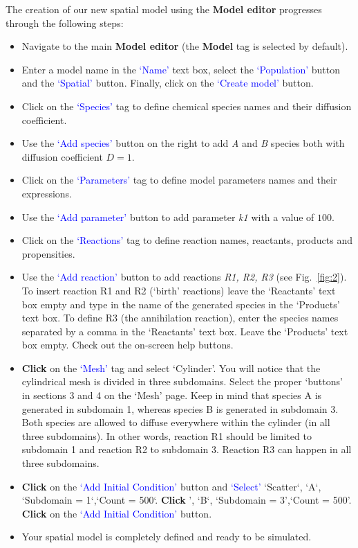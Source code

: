 The creation of our new spatial model using the \textbf{Model editor} progresses through the following steps:
\begin{itemize}
\item Navigate to the main \textbf{Model editor} (the \textbf{Model} tag is selected by default).
\item Enter a model name in the \textcolor{blue}{`Name'} text box, select the \textcolor{blue}{`Population'} button and the \textcolor{blue}{`Spatial'} button. Finally, click on the \textcolor{blue}{`Create model'}  button.
 \item Click on the \textcolor{blue}{`Species'} tag to define chemical species names and their diffusion coefficient. 
 \item Use the \textcolor{blue}{`Add species'} button on the right to add \textit{A} and \textit{B} species both with diffusion coefficient $D=1$.
 \item Click on the \textcolor{blue}{`Parameters'} tag to define model parameters names and their expressions. 
 \item Use the \textcolor{blue}{`Add parameter'} button to add parameter \textit{k1} with a value of $100$.
 \item Click on the \textcolor{blue}{`Reactions'} tag to define reaction names, reactants, products and propensities.
 \item Use the \textcolor{blue}{`Add reaction'} button to add reactions \textit{R1, R2, R3} (see Fig.~\ref{fig:2}). To insert reaction R1 and R2 (`birth' reactions) leave the `Reactants' text box empty and type in the name of the generated species in the `Products' text box.
 To define R3 (the annihilation reaction), enter the species names separated by a comma in the 
`Reactants' text box. Leave the `Products' text box empty. Check out the on-screen help buttons.
 \item \textbf{Click} on the \textcolor{blue}{`Mesh'} tag and select `Cylinder'. You will notice that the cylindrical mesh is divided in three subdomains. Select the proper `buttons' in sections 3 and 4 on the `Mesh' page. Keep in mind that species A is generated in subdomain 1, whereas species B is generated in subdomain 3. Both species are allowed to diffuse everywhere within the cylinder (in all three subdomains). In other words, reaction R1 should be limited to subdomain 1 and reaction R2 to subdomain 3. Reaction R3 can happen in all three subdomains.
  \item \textbf{Click} on the \textcolor{blue}{`Add Initial Condition'} button and \textcolor{blue}{`Select'} `Scatter`, `A`, `Subdomain = 1`,`Count = 500`. \textbf{Click} ', `B`, `Subdomain = 3',`Count = 500'. \textbf{Click} on the \textcolor{blue}{`Add Initial Condition'} button.
\item Your spatial model is completely defined and ready to be simulated.


\end{itemize}
